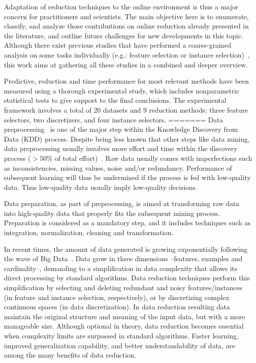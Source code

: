 \documentclass[preprint,12pt]{elsarticle}
\begin{document}
Adaptation of reduction techniques to the online environment is thus a major concern for practitioners and scientists. The main objective here is to enumerate, classify, and analyze those contributions on online reduction already presented in the literature, and outline future challenges for new developments in this topic. Although there exist previous studies that have performed a coarse-grained analysis on some tasks individually (e.g.: feature selection or instance selection)~\cite{bolon15, lu16}, this work aims at gathering all these studies in a combined and deeper overview. 

Predictive, reduction and time performance for most relevant methods have been measured using a thorough experimental study, which includes nonparametric statistical tests to give support to the final conclusions. The experimental framework involves a total of 20 datasets and 9 reduction methods; three feature selectors, two discretizers, and four instance selectors.
=======
Data preprocessing~\cite{garcia14} is one of the major step within the Knowledge Discovery from Data (KDD) process. Despite being less known that other steps like data mining, data preprocessing usually involves more effort and time within the discovery process ($> 50\%$ of total effort)~\cite{pyle99}. Raw data usually comes with imperfections such as inconsistencies, missing values, noise and/or redundancy. Performance of subsequent learning will thus be undermined if the process is fed with low-quality data. Thus low-quality data usually imply low-quality decisions.

Data preparation, as part of preprocessing, is aimed at transforming raw data into high-quality data that properly fits the subsequent mining process. Preparation is considered as a mandatory step, and it includes techniques such as integration, normalization, cleaning and transformation.

In recent times, the amount of data generated is growing exponentially following the wave of Big Data~\cite{mayer13}. Data grow in three dimensions --features, examples and cardinality--, demanding to a simplification in data complexity that allows its direct processing by standard algorithms. Data reduction techniques perform this simplification by selecting and deleting redundant and noisy features/instances (in feature and instance selection, respectively), or by discretizing complex continuous spaces (in data discretization). In data reduction resulting data maintain the original structure and meaning of the input data, but with a more manageable size. Although optional in theory, data reduction becomes essential when complexity limits are surpassed in standard algorithms. Faster learning, improved generalization capability, and better understandability of data, are among the many benefits of data reduction. 
\end{document}
